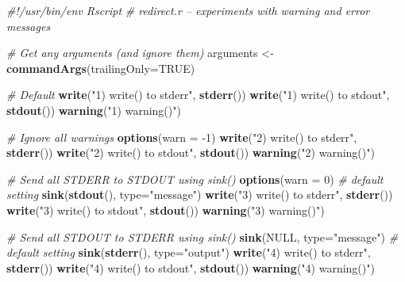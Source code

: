 \documentclass[]{book}
\newenvironment{Shaded}{\begin{snugshade}}{\end{snugshade}}
\newcommand{\CommentTok}[1]{\textcolor[rgb]{0.56,0.35,0.01}{\textit{#1}}}
\newcommand{\DataTypeTok}[1]{\textcolor[rgb]{0.13,0.29,0.53}{#1}}
\newcommand{\DecValTok}[1]{\textcolor[rgb]{0.00,0.00,0.81}{#1}}
\newcommand{\KeywordTok}[1]{\textcolor[rgb]{0.13,0.29,0.53}{\textbf{#1}}}
\newcommand{\NormalTok}[1]{#1}
\newcommand{\OtherTok}[1]{\textcolor[rgb]{0.56,0.35,0.01}{#1}}
\newcommand{\StringTok}[1]{\textcolor[rgb]{0.31,0.60,0.02}{#1}}
\begin{document}
\begin{Shaded}
\begin{Highlighting}[]
\CommentTok{#!/usr/bin/env Rscript}
\CommentTok{# redirect.r -- experiments with warning and error messages}

\CommentTok{# Get any arguments (and ignore them)}
\NormalTok{arguments <-}\StringTok{ }\KeywordTok{commandArgs}\NormalTok{(}\DataTypeTok{trailingOnly=}\OtherTok{TRUE}\NormalTok{)}

\CommentTok{# Default}
\KeywordTok{write}\NormalTok{(}\StringTok{"1) write() to stderr"}\NormalTok{, }\KeywordTok{stderr}\NormalTok{())}
\KeywordTok{write}\NormalTok{(}\StringTok{"1) write() to stdout"}\NormalTok{, }\KeywordTok{stdout}\NormalTok{())}
\KeywordTok{warning}\NormalTok{(}\StringTok{"1) warning()"}\NormalTok{)}

\CommentTok{# Ignore all warnings}
\KeywordTok{options}\NormalTok{(}\DataTypeTok{warn =} \DecValTok{-1}\NormalTok{)}
\KeywordTok{write}\NormalTok{(}\StringTok{"2) write() to stderr"}\NormalTok{, }\KeywordTok{stderr}\NormalTok{())}
\KeywordTok{write}\NormalTok{(}\StringTok{"2) write() to stdout"}\NormalTok{, }\KeywordTok{stdout}\NormalTok{())}
\KeywordTok{warning}\NormalTok{(}\StringTok{"2) warning()"}\NormalTok{)}

\CommentTok{# Send all STDERR to STDOUT using sink()}
\KeywordTok{options}\NormalTok{(}\DataTypeTok{warn =} \DecValTok{0}\NormalTok{) }\CommentTok{# default setting}
\KeywordTok{sink}\NormalTok{(}\KeywordTok{stdout}\NormalTok{(), }\DataTypeTok{type=}\StringTok{"message"}\NormalTok{)}
\KeywordTok{write}\NormalTok{(}\StringTok{"3) write() to stderr"}\NormalTok{, }\KeywordTok{stderr}\NormalTok{())}
\KeywordTok{write}\NormalTok{(}\StringTok{"3) write() to stdout"}\NormalTok{, }\KeywordTok{stdout}\NormalTok{())}
\KeywordTok{warning}\NormalTok{(}\StringTok{"3) warning()"}\NormalTok{)}

\CommentTok{# Send all STDOUT to STDERR using sink()}
\KeywordTok{sink}\NormalTok{(}\OtherTok{NULL}\NormalTok{, }\DataTypeTok{type=}\StringTok{"message"}\NormalTok{) }\CommentTok{# default setting}
\KeywordTok{sink}\NormalTok{(}\KeywordTok{stderr}\NormalTok{(), }\DataTypeTok{type=}\StringTok{"output"}\NormalTok{)}
\KeywordTok{write}\NormalTok{(}\StringTok{"4) write() to stderr"}\NormalTok{, }\KeywordTok{stderr}\NormalTok{())}
\KeywordTok{write}\NormalTok{(}\StringTok{"4) write() to stdout"}\NormalTok{, }\KeywordTok{stdout}\NormalTok{())}
\KeywordTok{warning}\NormalTok{(}\StringTok{"4) warning()"}\NormalTok{)}


\end{Highlighting}
\end{Shaded}
\end{document}
